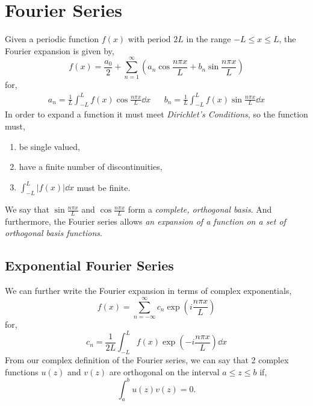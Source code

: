 \documentclass{book}
\begin{document}
\chapter{Fourier Series}
Given a periodic function $f(x)$ with period $2L$ in the range $-L \leq x \leq L$, the Fourier expansion is given by,
\begin{equation}
	\boxed{
	f(x) = \frac{a_0}{2} + \sum_{n=1}^{\infty}\left(a_n \cos \frac{n\pi x}{L} + b_n \sin\frac{n\pi x}{L}\right)
	}
\end{equation}
for,
\begin{align}
	\boxed{a_n = \frac{1}{L}\int_{-L}^{L}f(x)\cos\frac{n\pi x}{L}\dd{x}} && \boxed{b_n = \frac{1}{L}\int_{-L}^{L} f(x)\sin\frac{n\pi x}{L} \dd{x}}
\end{align}
In order to expand a function it must meet \textit{Dirichlet's Conditions}, so the function must,
\begin{enumerate}
	\item be single valued,
	\item have a finite number of discontinuities,
	\item $\int_{-L}^L|f(x)|\dd{x}$ must be finite.
\end{enumerate}
We say that $\sin \frac{n\pi x}{L}$ and $\cos\frac{n \pi x}{L}$ form a \textit{complete, orthogonal basis}. And furthermore, the Fourier series allows \textit{an expansion of a function on a set of orthogonal basis functions}.
\section{Exponential Fourier Series}
We can further write the Fourier expansion in terms of complex exponentials,
\begin{equation}
	\boxed{f(x) = \sum_{n = -\infty}^{\infty} c_n \exp\left(i \frac{n\pi x}{L}\right)}
\end{equation}
for,
\begin{equation}
	\boxed{c_n = \frac{1}{2L}\int_{-L}^{L}f(x)\exp\left(-i\frac{n\pi x}{L}\right)\dd{x}}
\end{equation}
From our complex definition of the Fourier series, we can say that 2 complex functions $u(z)$ and $v(z)$ are orthogonal on the interval $a \leq z \leq b$ if,
\begin{equation}
	\int_a^b u(z)v(z) = 0.
\end{equation}
\end{document}
